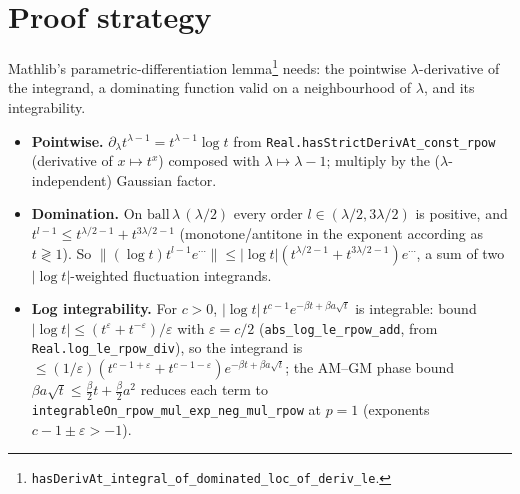 \documentclass[11pt]{article}
\begin{document}
\section{Proof strategy}
Mathlib's parametric-differentiation lemma\footnote{\texttt{hasDerivAt\_integral\_of\_dominated\_loc\_of\_deriv\_le}.}
needs: the pointwise $\lambda$-derivative of the integrand, a dominating function valid on a
neighbourhood of $\lambda$, and its integrability.
\begin{itemize}
\item \textbf{Pointwise.} $\partial_\lambda t^{\lambda-1}=t^{\lambda-1}\log t$ from
\texttt{Real.hasStrictDerivAt\_const\_rpow} (derivative of $x\mapsto t^x$) composed with $\lambda\mapsto
\lambda-1$; multiply by the ($\lambda$-independent) Gaussian factor.
\item \textbf{Domination.} On $\mathrm{ball}\,\lambda\,(\lambda/2)$ every order $l\in(\lambda/2,
3\lambda/2)$ is positive, and $t^{l-1}\le t^{\lambda/2-1}+t^{3\lambda/2-1}$ (monotone/antitone in the
exponent according as $t\gtrless1$). So $\|(\log t)t^{l-1}e^{\cdots}\|\le|\log t|(t^{\lambda/2-1}+
t^{3\lambda/2-1})e^{\cdots}$, a sum of two $|\log t|$-weighted fluctuation integrands.
\item \textbf{Log integrability.} For $c>0$, $|\log t|\,t^{c-1}e^{-\beta t+\beta a\sqrt t}$ is integrable:
bound $|\log t|\le(t^{\varepsilon}+t^{-\varepsilon})/\varepsilon$ with $\varepsilon=c/2$
(\texttt{abs\_log\_le\_rpow\_add}, from \texttt{Real.log\_le\_rpow\_div}), so the integrand is
$\le(1/\varepsilon)(t^{c-1+\varepsilon}+t^{c-1-\varepsilon})e^{-\beta t+\beta a\sqrt t}$; the AM--GM
phase bound $\beta a\sqrt t\le\tfrac\beta2 t+\tfrac\beta2 a^2$ reduces each term to
\texttt{integrableOn\_rpow\_mul\_exp\_neg\_mul\_rpow} at $p=1$ (exponents $c-1\pm\varepsilon>-1$).
\end{itemize}
\end{document}
